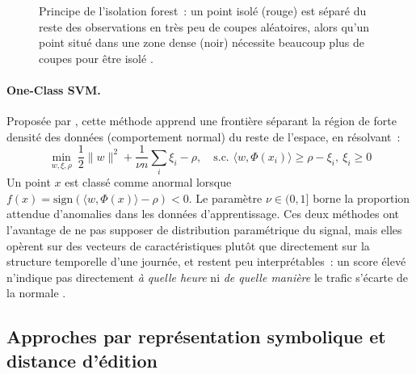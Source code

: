 \begin{figure}[htbp]
  \centering
  \caption[Principe de l'isolation forest]{Principe de l'isolation forest~: un point isolé (rouge) est séparé du reste des observations en très peu de coupes aléatoires, alors qu'un point situé dans une zone dense (noir) nécessite beaucoup plus de coupes pour être isolé \parencite{liu2008isolation}.}
  \label{fig:isoforest}
\end{figure}

\paragraph{One-Class SVM.}
Proposée par \textcite{scholkopf2001estimating}, cette méthode
apprend une frontière séparant la région de forte densité des données
(comportement normal) du reste de l'espace, en résolvant~:
\begin{equation}
  \min_{w,\xi,\rho} \ \frac{1}{2}\|w\|^2 + \frac{1}{\nu n}\sum_i \xi_i - \rho,
  \quad \text{s.c. } \langle w, \Phi(x_i)\rangle \geq \rho - \xi_i,\ \xi_i \geq 0
\end{equation}
Un point $x$ est classé comme anormal lorsque
$f(x) = \mathrm{sign}(\langle w, \Phi(x)\rangle - \rho) < 0$. Le
paramètre $\nu \in (0,1]$ borne la proportion attendue d'anomalies
dans les données d'apprentissage. Ces deux méthodes ont l'avantage de
ne pas supposer de distribution paramétrique du signal, mais elles
opèrent sur des vecteurs de caractéristiques plutôt que directement
sur la structure temporelle d'une journée, et restent peu
interprétables~: un score élevé n'indique pas directement \emph{à
quelle heure} ni \emph{de quelle manière} le trafic s'écarte de la
normale \parencite{chalapathy2019deep}.

\subsection{Approches par représentation symbolique et distance d'édition}

